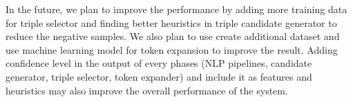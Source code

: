 \documentclass[conference,compsoc]{IEEEtran}
\begin{document}
In the future, we plan to improve the performance by adding more training data for triple selector and finding better heuristics in triple candidate generator to reduce the negative samples. We also plan to use create additional dataset and use machine learning model for token expansion to improve the result. Adding confidence level in the output of every phases (NLP pipelines, candidate generator, triple selector, token expander) and include it as features and heuristics may also improve the overall performance of the system.






\end{document}
